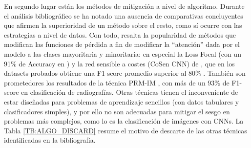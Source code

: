 En segundo lugar están los métodos de mitigación a nivel de algoritmo. Durante el análisis bibliográfico se ha notado una ausencia de comparativas concluyentes que afirmen la superioridad de un método sobre el resto, como sí ocurre con las estrategias a nivel de datos. Con todo, resalta la popularidad de métodos que modifican las funciones de pérdida a fin de modificar la ``atención'' dada por el modelo a las clases mayoritaria y minoritaria: en especial la Loss Focal (con un 91\% de Accuracy en \citet{lin2017focal}) y la red sensible a costes (CoSen CNN) de \citet{khan2017cost}, que en los datasets probados obtiene una F1-score promedio superior al 80\% \cite{johnson2019survey}. También son prometedores los resultados de la técnica PRM-IM \cite{liu2022solving}, con más de un 93\% de F1-score en clasificación de radiografías. Otras técnicas tienen el inconveniente de estar diseñadas para problemas de aprendizaje sencillos (con datos tabulares y clasificadores simples), y por ello no son adecuadas para mitigar el sesgo en problemas más complejos, como lo es la clasificación de imágenes con CNNs. La Tabla \ref{TB:ALGO_DISCARD} resume el motivo de descarte de las otras técnicas identificadas en la bibliografía.


